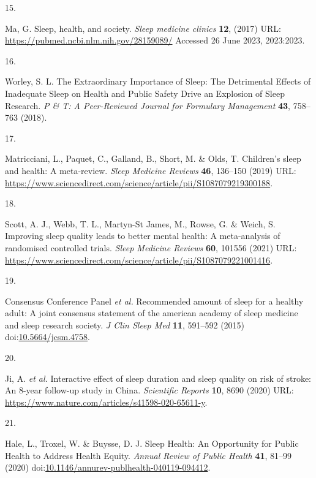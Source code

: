 \documentclass[
  10pt,
]{scrbook}
\newlength{\cslhangindent}
\newlength{\csllabelwidth}
\newlength{\cslentryspacingunit} %
\newenvironment{CSLReferences}[2] %
 {%
  \setlength{\parindent}{0pt}
  \ifodd #1
  \let\oldpar\par
  \def\par{\hangindent=\cslhangindent\oldpar}
  \fi
  \setlength{\parskip}{#2\cslentryspacingunit}
 }%
 {}
\newcommand{\CSLLeftMargin}[1]{\parbox[t]{\csllabelwidth}{#1}}
\newcommand{\CSLRightInline}[1]{\parbox[t]{\linewidth - \csllabelwidth}{#1}\break}
\let\originaltextbf\textbf
\renewcommand{\textbf}[1]{\textcolor{color1}{\originaltextbf{#1}}}
\begin{document}
\begin{CSLReferences}{0}{0}
\leavevmode{}%
\CSLLeftMargin{15. }%
\CSLRightInline{Ma, G. Sleep, health, and society. \emph{Sleep medicine
clinics} \textbf{12}, (2017) URL:
\url{https://pubmed.ncbi.nlm.nih.gov/28159089/} Accessed 26 June 2023,
2023:2023.}

\leavevmode{}%
\CSLLeftMargin{16. }%
\CSLRightInline{Worley, S. L. The Extraordinary Importance of Sleep: The
Detrimental Effects of Inadequate Sleep on Health and Public Safety
Drive an Explosion of Sleep Research. \emph{P \& T: A Peer-Reviewed
Journal for Formulary Management} \textbf{43}, 758--763 (2018).}

\leavevmode{}%
\CSLLeftMargin{17. }%
\CSLRightInline{Matricciani, L., Paquet, C., Galland, B., Short, M. \&
Olds, T. Children's sleep and health: A meta-review. \emph{Sleep
Medicine Reviews} \textbf{46}, 136--150 (2019) URL:
\url{https://www.sciencedirect.com/science/article/pii/S1087079219300188}.}

\leavevmode{}%
\CSLLeftMargin{18. }%
\CSLRightInline{Scott, A. J., Webb, T. L., Martyn-St James, M., Rowse,
G. \& Weich, S. Improving sleep quality leads to better mental health: A
meta-analysis of randomised controlled trials. \emph{Sleep Medicine
Reviews} \textbf{60}, 101556 (2021) URL:
\url{https://www.sciencedirect.com/science/article/pii/S1087079221001416}.}

\leavevmode{}%
\CSLLeftMargin{19. }%
\CSLRightInline{Consensus Conference Panel \emph{et al.} Recommended
amount of sleep for a healthy adult: A joint consensus statement of the
american academy of sleep medicine and sleep research society. \emph{J
Clin Sleep Med} \textbf{11}, 591--592 (2015)
doi:\href{https://doi.org/10.5664/jcsm.4758}{10.5664/jcsm.4758}.}

\leavevmode{}%
\CSLLeftMargin{20. }%
\CSLRightInline{Ji, A. \emph{et al.} Interactive effect of sleep
duration and sleep quality on risk of stroke: An 8-year follow-up study
in China. \emph{Scientific Reports} \textbf{10}, 8690 (2020) URL:
\url{https://www.nature.com/articles/s41598-020-65611-y}.}

\leavevmode{}%
\CSLLeftMargin{21. }%
\CSLRightInline{Hale, L., Troxel, W. \& Buysse, D. J. Sleep Health: An
Opportunity for Public Health to Address Health Equity. \emph{Annual
Review of Public Health} \textbf{41}, 81--99 (2020)
doi:\href{https://doi.org/10.1146/annurev-publhealth-040119-094412}{10.1146/annurev-publhealth-040119-094412}.}


\end{CSLReferences}
\end{document}
